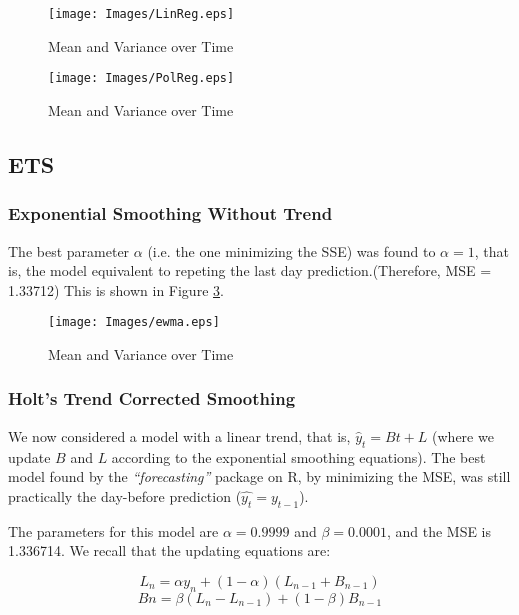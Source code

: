 \begin{figure}[!ht]
        \centering
        \texttt{[image: Images/LinReg.eps]}
        \caption{Mean and Variance over Time}
        \label{fig:linReg}
\end{figure}

\begin{figure}[!ht]
        \centering
        \texttt{[image: Images/PolReg.eps]}
        \caption{Mean and Variance over Time}
        \label{fig:polReg}
\end{figure}



\subsection{ETS}

\subsubsection{Exponential Smoothing Without Trend}

The best parameter $\alpha$ (i.e. the one minimizing the SSE) was found to $\alpha = 1$, 
that is, the model equivalent to repeting the last day prediction.(Therefore, MSE = 1.33712)
This is shown in Figure
\ref{fig:ewma}. 

\begin{figure}[!ht]
	\centering
	\texttt{[image: Images/ewma.eps]}
        \caption{Mean and Variance over Time}
        \label{fig:ewma}
\end{figure}

\subsubsection{Holt's Trend Corrected Smoothing}

We now considered a model with a linear trend, that is, $\hat{y}_t = B t + L$
(where we update $B$ and $L$ according to the exponential smoothing equations).
The best model found by the \textit{``forecasting''} package on R, by minimizing the MSE,
was still practically the day-before prediction ($\hat{y_t} = y_{t-1}$).

The parameters for this model are  $\alpha = 0.9999 $ and $\beta = 0.0001$, and the MSE is 1.336714.
We recall that the updating equations are:

$$
L_n = \alpha y_n + (1 − \alpha)(L_{n−1} + B_{n−1})
$$
$$
Bn = \beta(L_n − L_{n−1} ) + (1 − \beta)B_{n−1}
$$

